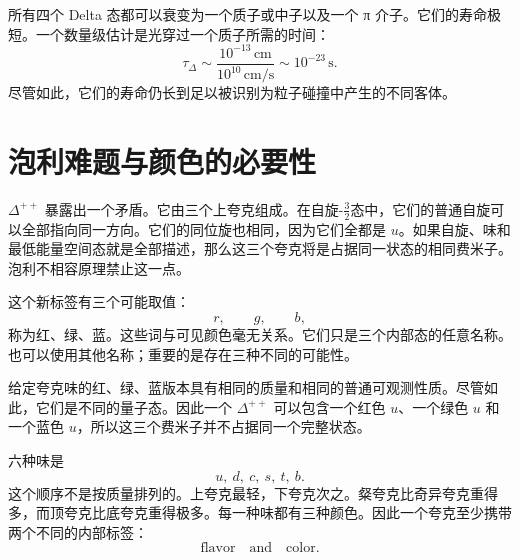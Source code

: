 所有四个 Delta 态都可以衰变为一个质子或中子以及一个 {\proseunicodefont π} 介子。它们的寿命极短。一个数量级估计是光穿过一个质子所需的时间：
\begin{equation}
\tau_\Delta
\sim
\frac{10^{-13}\,\mathrm{cm}}
     {10^{10}\,\mathrm{cm/s}}
\sim10^{-23}\,\mathrm{s}.
\end{equation}
尽管如此，它们的寿命仍长到足以被识别为粒子碰撞中产生的不同客体。

\begin{classroomqa}
\end{classroomqa}

\section{泡利难题与颜色的必要性}

\(\Delta^{++}\) 暴露出一个矛盾。它由三个上夸克组成。在自旋-\(\tfrac32\)态中，它们的普通自旋可以全部指向同一方向。它们的同位旋也相同，因为它们全都是 \(u\)。如果自旋、味和最低能量空间态就是全部描述，那么这三个夸克将是占据同一状态的相同费米子。泡利不相容原理禁止这一点。

\begin{classroomqa}
\end{classroomqa}

这个新标签有三个可能取值：
\begin{equation}
r,\qquad g,\qquad b,
\end{equation}
称为红、绿、蓝。这些词与可见颜色毫无关系。它们只是三个内部态的任意名称。也可以使用其他名称；重要的是存在三种不同的可能性。

给定夸克味的红、绿、蓝版本具有相同的质量和相同的普通可观测性质。尽管如此，它们是不同的量子态。因此一个 \(\Delta^{++}\) 可以包含一个红色 \(u\)、一个绿色 \(u\) 和一个蓝色 \(u\)，所以这三个费米子并不占据同一个完整状态。

六种味是
\begin{equation}
u,\ d,\ c,\ s,\ t,\ b.
\end{equation}
这个顺序不是按质量排列的。上夸克最轻，下夸克次之。粲夸克比奇异夸克重得多，而顶夸克比底夸克重得极多。每一种味都有三种颜色。因此一个夸克至少携带两个不同的内部标签：
\begin{equation}
\text{flavor}\quad\text{and}\quad\text{color}.
\end{equation}

